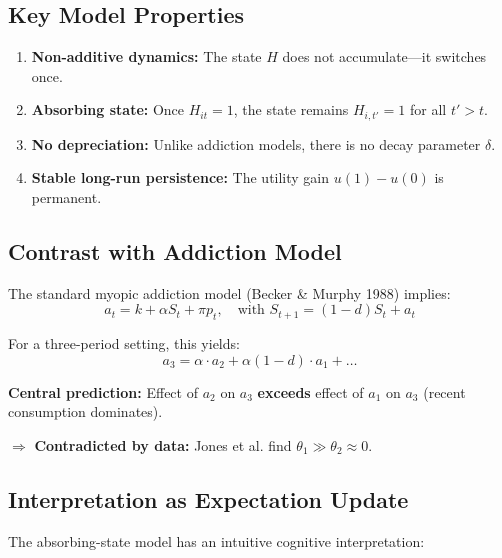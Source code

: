 \subsection{Key Model Properties}

\begin{enumerate}
\item \textbf{Non-additive dynamics:} The state $H$ does not accumulate---it switches once.

\item \textbf{Absorbing state:} Once $H_{it} = 1$, the state remains $H_{i,t'} = 1$ for all $t' > t$.

\item \textbf{No depreciation:} Unlike addiction models, there is no decay parameter $\delta$.

\item \textbf{Stable long-run persistence:} The utility gain $u(1) - u(0)$ is permanent.
\end{enumerate}

\subsection{Contrast with Addiction Model}

The standard myopic addiction model (Becker \& Murphy 1988) implies:
\begin{equation}
a_t = k + \alpha S_t + \pi p_t, \quad \text{with } S_{t+1} = (1-d) S_t + a_t
\end{equation}

For a three-period setting, this yields:
\begin{equation}
a_3 = \alpha \cdot a_2 + \alpha(1-d) \cdot a_1 + \ldots
\end{equation}

\textbf{Central prediction:} Effect of $a_2$ on $a_3$ \textbf{exceeds} effect of $a_1$ on $a_3$
(recent consumption dominates).

$\Rightarrow$ \textbf{Contradicted by data:} Jones et al. find $\theta_1 \gg \theta_2 \approx 0$.

\subsection{Interpretation as Expectation Update}

The absorbing-state model has an intuitive cognitive interpretation:

